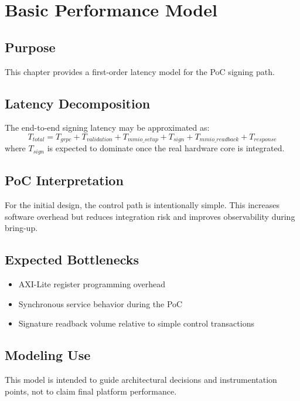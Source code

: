 \chapter{Basic Performance Model}

\section*{Purpose}
This chapter provides a first-order latency model for the PoC signing path.

\section{Latency Decomposition}
The end-to-end signing latency may be approximated as:
\[
T_{total} = T_{grpc} + T_{validation} + T_{mmio\_setup} + T_{sign} + T_{mmio\_readback} + T_{response}
\]
where $T_{sign}$ is expected to dominate once the real hardware core is integrated.

\section{PoC Interpretation}
For the initial design, the control path is intentionally simple. This increases software overhead but reduces integration risk and improves observability during bring-up.

\section{Expected Bottlenecks}
\begin{itemize}[leftmargin=*]
  \item AXI-Lite register programming overhead
  \item Synchronous service behavior during the PoC
  \item Signature readback volume relative to simple control transactions
\end{itemize}

\section{Modeling Use}
This model is intended to guide architectural decisions and instrumentation points, not to claim final platform performance.
